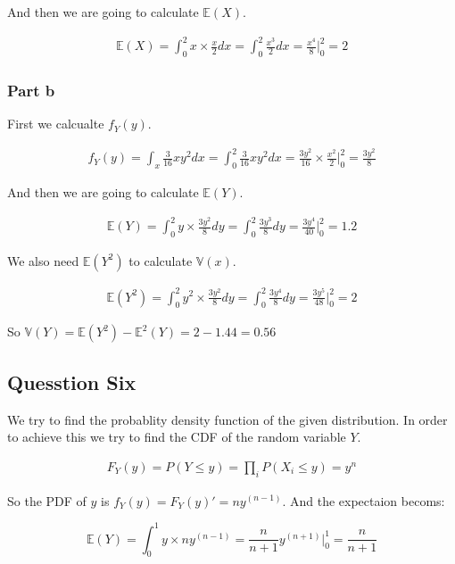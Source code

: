 \documentclass[12pt, a4paper]{book}
\begin{document}
And then we are going to calculate $\mathbb{E}(X)$.

\begin{eqnarray*}
    \mathbb{E}(X) = \int_0^2 x \times \frac{x}{2} dx = \int_0^2 \frac{x^3}{2} dx = \frac{x^4}{8}\Big|_0^2 = 2
\end{eqnarray*}

\subsubsection*{Part b}

First we calcualte $f_Y(y)$.

\begin{eqnarray*}
    f_Y(y) = \int_x \frac{3}{16} xy^2 dx = \int_0^2 \frac{3}{16} xy^2 dx = \frac{3y^2}{16} \times \frac{x^2}{2}\Big|_0^2 = \frac{3y^2}{8}
\end{eqnarray*}

And then we are going to calculate $\mathbb{E}(Y)$.

\begin{eqnarray*}
    \mathbb{E}(Y) = \int_0^2 y \times \frac{3y^2}{8} dy = \int_0^2 \frac{3y^3}{8} dy = \frac{3y^4}{40}\Big|_0^2 = 1.2
\end{eqnarray*}

We also need $\mathbb{E}(Y^2)$ to calculate $\mathbb{V}(x)$.

\begin{eqnarray*}
    \mathbb{E}(Y^2) = \int_0^2 y^2 \times \frac{3y^2}{8} dy = \int_0^2 \frac{3y^4}{8} dy = \frac{3y^5}{48}\Big|_0^2 = 2
\end{eqnarray*}

So $\mathbb{V}(Y) = \mathbb{E}(Y^2) - \mathbb{E}^2(Y) = 2 - 1.44 = 0.56$

\subsection*{Quesstion Six}

We try to find the probablity density function of the given distribution. In order to achieve this we try to find
the CDF of the random variable $Y$.

\begin{eqnarray*}
    F_Y(y) = P(Y \le y) = \prod_{i} P(X_i \le y) = y^n
\end{eqnarray*}

So the PDF of $y$ is $f_Y(y) = F_Y(y)' = ny^{(n-1)}$. And the expectaion becoms:

\begin{equation*}
    \mathbb{E}(Y) = \int_0^1 y \times n y^{(n-1)} = \frac{n}{n+1}y^(n+1) \Big|_0^1 = \frac{n}{n+1}
\end{equation*}
\end{document}
